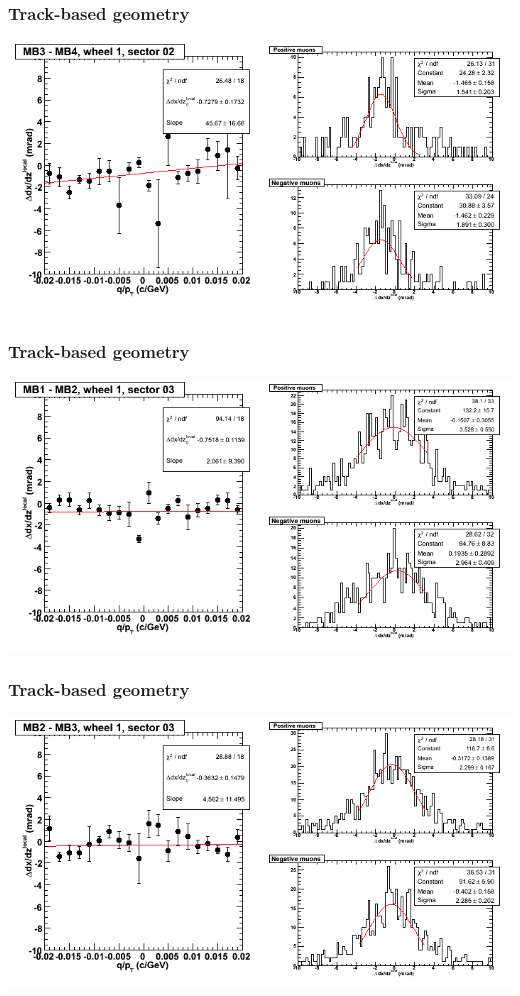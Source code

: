 \documentclass[compress]{beamer}
\begin{document}
\begin{frame}
\frametitle{Track-based geometry}
\includegraphics[width=\linewidth]{NOV4_segdiffs/dt13_slope_D_02_34.png}
\end{frame}

\begin{frame}
\frametitle{Track-based geometry}
\includegraphics[width=\linewidth]{NOV4_segdiffs/dt13_slope_D_03_12.png}
\end{frame}

\begin{frame}
\frametitle{Track-based geometry}
\includegraphics[width=\linewidth]{NOV4_segdiffs/dt13_slope_D_03_23.png}
\end{frame}
\end{document}
